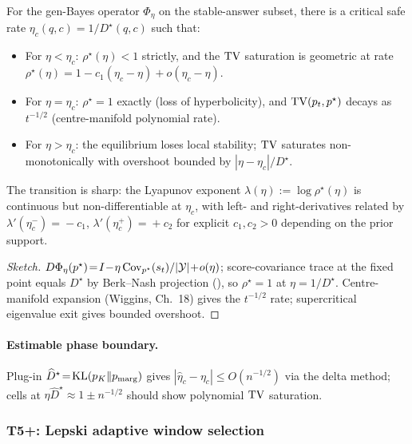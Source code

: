 \begin{theorem}
\label{thm:phase-transition}
For the gen-Bayes operator $\Phi_\eta$ on the stable-answer subset,
there is a critical safe rate $\eta_c(q,c)\!=\!1/D^\star(q,c)$
such that:
\begin{itemize}
\item For $\eta\!<\!\eta_c$: $\rho^\star(\eta)\!<\!1$ strictly,
and the $\operatorname{TV}$ saturation is geometric at rate
$\rho^\star(\eta)\!=\!1\!-\!c_1(\eta_c\!-\!\eta)\!+\!o(\eta_c\!-\!\eta)$.
\item For $\eta\!=\!\eta_c$: $\rho^\star\!=\!1$ exactly (loss of
hyperbolicity), and $\operatorname{TV}(p_t,p^\star)$ decays as $t^{-1/2}$
(centre-manifold polynomial rate).
\item For $\eta\!>\!\eta_c$: the equilibrium loses local stability;
$\operatorname{TV}$ saturates non-monotonically with overshoot bounded by
$|\eta\!-\!\eta_c|/D^\star$.
\end{itemize}
The transition is sharp: the Lyapunov exponent
$\lambda(\eta)\!:=\!\log\rho^\star(\eta)$ is continuous but
non-differentiable at $\eta_c$, with left- and right-derivatives
related by $\lambda'(\eta_c^{-})\!=\!-c_1$,
$\lambda'(\eta_c^{+})\!=\!+c_2$ for explicit
$c_1,c_2\!>\!0$ depending on the prior support.
\end{theorem}

\begin{proof}[Sketch]
$D\Phi_\eta(p^\star)\!=\!I\!-\!\eta\,\mathrm{Cov}_{p^\star}(s_t)/|\mathcal{Y}|\!+\!o(\eta)$;
score-covariance trace at the fixed point equals $D^\star$ by
Berk--Nash projection (), so
$\rho^\star\!=\!1$ at $\eta\!=\!1/D^\star$.  Centre-manifold
expansion (Wiggins, Ch.~18) gives the $t^{-1/2}$ rate; supercritical
eigenvalue exit gives bounded overshoot.
\end{proof}

\paragraph{Estimable phase boundary.}
Plug-in $\widehat D^\star\!=\!\operatorname{KL}(p_K\|p_{\mathrm{marg}})$ gives
$|\widehat\eta_c\!-\!\eta_c|\!\le\!O(n^{-1/2})$ via the delta
method; cells at $\eta\widehat D^\star\!\approx\!1\!\pm\!n^{-1/2}$
should show polynomial $\operatorname{TV}$ saturation.

\subsubsection{T5+: Lepski adaptive window selection}
\label{app:t5-lepski}

